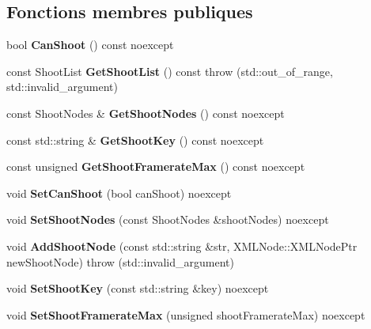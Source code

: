 \subsection*{Fonctions membres publiques}
\begin{DoxyCompactItemize}
\item 
\mbox{\label{classmy_1_1Shooter_a074f3f97399ae7f4b93d365cda93610c}} 
bool {\bfseries Can\+Shoot} () const noexcept
\item 
\mbox{\label{classmy_1_1Shooter_a829b2be6f57ce7d21ade456380168d86}} 
const Shoot\+List {\bfseries Get\+Shoot\+List} () const  throw (std\+::out\+\_\+of\+\_\+range, std\+::invalid\+\_\+argument)
\item 
\mbox{\label{classmy_1_1Shooter_a8bd2cf898da70f9ab05e1b3d9a8f246f}} 
const Shoot\+Nodes \& {\bfseries Get\+Shoot\+Nodes} () const noexcept
\item 
\mbox{\label{classmy_1_1Shooter_aaeab68a3e46942098d351b7958afa04e}} 
const std\+::string \& {\bfseries Get\+Shoot\+Key} () const noexcept
\item 
\mbox{\label{classmy_1_1Shooter_ab8882679b9b128e2b0f9b036b584ac58}} 
const unsigned {\bfseries Get\+Shoot\+Framerate\+Max} () const noexcept
\item 
\mbox{\label{classmy_1_1Shooter_a5e8b4144be7d18ecd74cefff1d1ec696}} 
void {\bfseries Set\+Can\+Shoot} (bool can\+Shoot) noexcept
\item 
\mbox{\label{classmy_1_1Shooter_a2f99b7f7802dd20fec49e571cfcfb887}} 
void {\bfseries Set\+Shoot\+Nodes} (const Shoot\+Nodes \&shoot\+Nodes) noexcept
\item 
\mbox{\label{classmy_1_1Shooter_a2b6302544a8010b4f379c353ed6bfbac}} 
void {\bfseries Add\+Shoot\+Node} (const std\+::string \&str, X\+M\+L\+Node\+::\+X\+M\+L\+Node\+Ptr new\+Shoot\+Node)  throw (std\+::invalid\+\_\+argument)
\item 
\mbox{\label{classmy_1_1Shooter_afe3aa39abd0c4131b811596dcffa45a6}} 
void {\bfseries Set\+Shoot\+Key} (const std\+::string \&key) noexcept
\item 
\mbox{\label{classmy_1_1Shooter_ada55bbd697ad01242a5cbb07b691b27d}} 
void {\bfseries Set\+Shoot\+Framerate\+Max} (unsigned shoot\+Framerate\+Max) noexcept
\end{DoxyCompactItemize}
